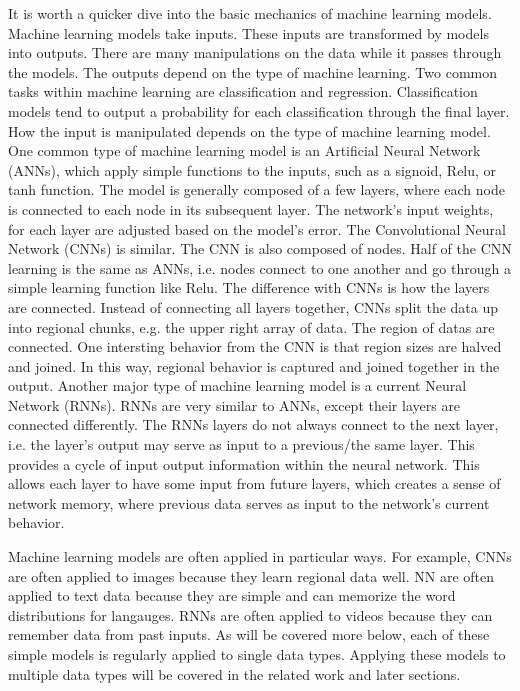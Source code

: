 It is worth a quicker dive into the basic mechanics of machine learning models. Machine learning models take inputs.  These inputs are transformed by models into outputs.  There are many manipulations on the data while it passes through the models.  The outputs depend on the type of machine learning.  Two common tasks within machine learning are classification and regression.  Classification models tend to output a probability for each classification through the final layer.  How the input is manipulated depends on the type of machine learning model.  One common type of machine learning model is an Artificial Neural Network (ANNs), which apply simple functions to the inputs, such as a signoid, Relu, or tanh function.  The model is generally composed of a few layers, where each node is connected to each node in its subsequent layer.  The network's input weights, for each layer are adjusted based on the model's error.  The Convolutional Neural Network (CNNs) is similar.  The CNN is also composed of nodes.  Half of the CNN learning is the same as ANNs, i.e. nodes connect to one another and go through a simple learning function like Relu.  The difference with CNNs is how the layers are connected.  Instead of connecting all layers together, CNNs split the data up into regional chunks, e.g. the upper right array of data.  The region of datas are connected.  One intersting behavior from the CNN is that region sizes are halved and joined.  In this way, regional behavior is captured and joined together in the output.  Another major type of machine learning model is a current Neural Network (RNNs).  RNNs are very similar to ANNs, except their layers are connected differently.  The RNNs layers do not always connect to the next layer, i.e. the layer's output may serve as input to a previous/the same layer.  This provides a cycle of input output information within the neural network.  This allows each layer to have some input from future layers, which creates a sense of network memory, where previous data serves as input to the network's current behavior.  

Machine learning models are often applied in particular ways.  For example, CNNs are often applied to images because they learn regional data well.  NN are often applied to text data because they are simple and can memorize the word distributions for langauges.  RNNs are often applied to videos because they can remember data from past inputs.  As will be covered more below, each of these simple models is regularly applied to single data types.  Applying these models to multiple data types will be covered in the related work and later sections.  

